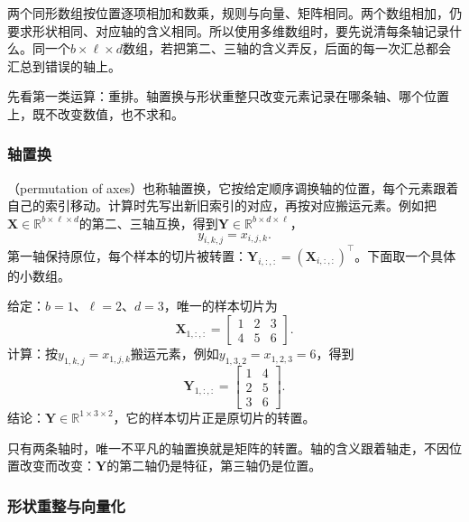 两个同形数组按位置逐项相加和数乘，规则与向量、矩阵相同。两个数组相加，仍要求形状相同、对应轴的含义相同。所以使用多维数组时，要先说清每条轴记录什么。同一个$b\times\ell\times d$数组，若把第二、三轴的含义弄反，后面的每一次汇总都会汇总到错误的轴上。

\label{sec:ls-tensor-operations}

先看第一类运算：重排。轴置换与形状重整只改变元素记录在哪条轴、哪个位置上，既不改变数值，也不求和。

\subsubsection{轴置换}
\label{sec:ls-tensor-reshaping}
\label{sec:linear-algebra-tensors-structured-operations}

（permutation of axes）也称轴置换，它按给定顺序调换轴的位置，每个元素跟着自己的索引移动。计算时先写出新旧索引的对应，再按对应搬运元素。例如把$\bm X\in\mathbb R^{b\times\ell\times d}$的第二、三轴互换，得到$\bm Y\in\mathbb R^{b\times d\times\ell}$，
\[
 y_{i,k,j}=x_{i,j,k}.
\]
第一轴保持原位，每个样本的切片被转置：$\bm Y_{i,:,:}=(\bm X_{i,:,:})^\top$。下面取一个具体的小数组。
\begin{example}[交换后两条轴]
\label{ex:ls-axis-swap}
给定：$b=1$、$\ell=2$、$d=3$，唯一的样本切片为
\[
 \bm X_{1,:,:}=\begin{bmatrix}1&2&3\\4&5&6\end{bmatrix}.
\]
计算：按$y_{1,k,j}=x_{1,j,k}$搬运元素，例如$y_{1,3,2}=x_{1,2,3}=6$，得到
\[
 \bm Y_{1,:,:}=\begin{bmatrix}1&4\\2&5\\3&6\end{bmatrix}.
\]
结论：$\bm Y\in\mathbb R^{1\times3\times2}$，它的样本切片正是原切片的转置。
\end{example}
只有两条轴时，唯一不平凡的轴置换就是矩阵的转置。轴的含义跟着轴走，不因位置改变而改变：$\bm Y$的第二轴仍是特征，第三轴仍是位置。

\subsubsection{形状重整与向量化}

